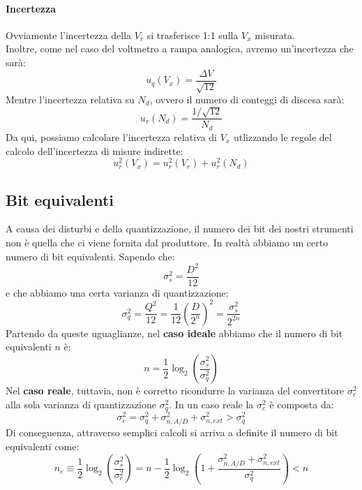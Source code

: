 \documentclass{article}
\begin{document}
	\paragraph*{Incertezza}
	Ovviamente l'incertezza della $V_r$ si trasferisce 1:1 sulla $V_x$ misurata.\\
	Inoltre, come nel caso del voltmetro a rampa analogica, avremo un'incertezza che sarà:
	\begin{equation}
		u_q(V_x) = \frac{\Delta V}{\sqrt{12}}
	\end{equation}
	Mentre l'incertezza relativa su $N_d$, ovvero il numero di conteggi di discesa sarà:
	\begin{equation}
		u_r(N_d) = \frac{1/\sqrt{12}}{N_d}
	\end{equation}
	Da qui, possiamo calcolare l'incertezza relativa di $V_x$ utlizzando le regole del calcolo dell'incertezza di misure indirette:
	\begin{equation}
		u^2_r(V_x) = u^2_r(V_r) + u^2_r(N_d)
	\end{equation}
	\subsection*{Bit equivalenti}
	A causa dei disturbi e della quantizzazione, il numero dei bit dei nostri strumenti non è quella che ci viene fornita dal produttore. In realtà abbiamo un certo numero di bit equivalenti.
	Sapendo che:
	\begin{equation}
		\sigma_s^2 = \frac{D^2}{12}
	\end{equation}
	e che abbiamo una certa varianza di quantizzazione:
	\begin{equation}
		\sigma^2_q = \frac{Q^2}{12} = \frac{1}{12} \left( \frac{D}{2^n} \right)^2 = \frac{\sigma_s^2}{2^{2n}}
	\end{equation}
	Partendo da queste uguaglianze, nel \textbf{caso ideale} abbiamo che il numero di bit equivalenti $n$ è:
	\begin{equation}
		n = \frac{1}{2}\log_{2}\left(\frac{\sigma_s^2}{\sigma_q^2}\right)
	\end{equation}
	Nel \textbf{caso reale}, tuttavia, non è corretto ricondurre la varianza del convertitore $\sigma_c^2$ alla sola varianza di quantizzazione $\sigma_q^2$. In un caso reale la $\sigma_c^2$ è composta da:
	\begin{equation}
		\sigma^2_c = \sigma^2_q + \sigma^2_{n,A/D} + \sigma^2_{n,ext} > \sigma^2_q
	\end{equation}
	Di conseguenza, attraverso semplici calcoli si arriva a definite il numero di bit equivalenti come:
	\begin{equation}
		n_e \equiv \frac{1}{2}\log_{2}\left(\frac{\sigma^2_s}{\sigma^2_c}\right) = n - \frac{1}{2}\log_{2}\left(1 + \frac{\sigma^2_{n,A/D} + \sigma^2_{n,ext}}{\sigma^2_q}\right) < n
	\end{equation}
\end{document}
